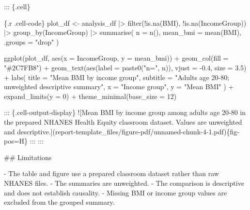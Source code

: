 \documentclass[
  letterpaper,
  DIV=11,
  numbers=noendperiod,
  oneside]{scrreprt}
\newenvironment{Shaded}{\begin{snugshade}}{\end{snugshade}}
\newcommand{\AlertTok}[1]{\textcolor[rgb]{0.68,0.00,0.00}{#1}}
\newcommand{\AttributeTok}[1]{\textcolor[rgb]{0.40,0.45,0.13}{#1}}
\newcommand{\DecValTok}[1]{\textcolor[rgb]{0.68,0.00,0.00}{#1}}
\newcommand{\FloatTok}[1]{\textcolor[rgb]{0.68,0.00,0.00}{#1}}
\newcommand{\FunctionTok}[1]{\textcolor[rgb]{0.28,0.35,0.67}{#1}}
\newcommand{\InformationTok}[1]{\textcolor[rgb]{0.37,0.37,0.37}{#1}}
\newcommand{\NormalTok}[1]{\textcolor[rgb]{0.00,0.23,0.31}{#1}}
\newcommand{\OtherTok}[1]{\textcolor[rgb]{0.00,0.23,0.31}{#1}}
\newcommand{\SpecialCharTok}[1]{\textcolor[rgb]{0.37,0.37,0.37}{#1}}
\newcommand{\SpecialStringTok}[1]{\textcolor[rgb]{0.13,0.47,0.30}{#1}}
\newcommand{\StringTok}[1]{\textcolor[rgb]{0.13,0.47,0.30}{#1}}
\begin{document}
\begin{Shaded}
\begin{Highlighting}[numbers=left,,]
\NormalTok{::: \{.cell\}}

\InformationTok{\textasciigrave{}\textasciigrave{}\textasciigrave{}\{.r .cell{-}code\}}
\NormalTok{plot\_df }\OtherTok{\textless{}{-}}\NormalTok{ analysis\_df }\SpecialCharTok{|\textgreater{}}
  \FunctionTok{filter}\NormalTok{(}\SpecialCharTok{!}\FunctionTok{is.na}\NormalTok{(BMI), }\SpecialCharTok{!}\FunctionTok{is.na}\NormalTok{(IncomeGroup)) }\SpecialCharTok{|\textgreater{}}
  \FunctionTok{group\_by}\NormalTok{(IncomeGroup) }\SpecialCharTok{|\textgreater{}}
  \FunctionTok{summarise}\NormalTok{(}
    \AttributeTok{n =} \FunctionTok{n}\NormalTok{(),}
    \AttributeTok{mean\_bmi =} \FunctionTok{mean}\NormalTok{(BMI),}
    \AttributeTok{.groups =} \StringTok{"drop"}
\NormalTok{  )}

\FunctionTok{ggplot}\NormalTok{(plot\_df, }\FunctionTok{aes}\NormalTok{(}\AttributeTok{x =}\NormalTok{ IncomeGroup, }\AttributeTok{y =}\NormalTok{ mean\_bmi)) }\SpecialCharTok{+}
  \FunctionTok{geom\_col}\NormalTok{(}\AttributeTok{fill =} \StringTok{"\#2C7FB8"}\NormalTok{) }\SpecialCharTok{+}
  \FunctionTok{geom\_text}\NormalTok{(}\FunctionTok{aes}\NormalTok{(}\AttributeTok{label =} \FunctionTok{paste0}\NormalTok{(}\StringTok{"n="}\NormalTok{, n)), }\AttributeTok{vjust =} \SpecialCharTok{{-}}\FloatTok{0.4}\NormalTok{, }\AttributeTok{size =} \FloatTok{3.5}\NormalTok{) }\SpecialCharTok{+}
  \FunctionTok{labs}\NormalTok{(}
    \AttributeTok{title =} \StringTok{"Mean BMI by income group"}\NormalTok{,}
    \AttributeTok{subtitle =} \StringTok{"Adults age 20{-}80; unweighted descriptive summary"}\NormalTok{,}
    \AttributeTok{x =} \StringTok{"Income group"}\NormalTok{,}
    \AttributeTok{y =} \StringTok{"Mean BMI"}
\NormalTok{  ) }\SpecialCharTok{+}
  \FunctionTok{expand\_limits}\NormalTok{(}\AttributeTok{y =} \DecValTok{0}\NormalTok{) }\SpecialCharTok{+}
  \FunctionTok{theme\_minimal}\NormalTok{(}\AttributeTok{base\_size =} \DecValTok{12}\NormalTok{)}
\InformationTok{\textasciigrave{}\textasciigrave{}\textasciigrave{}}

\NormalTok{::: \{.cell{-}output{-}display\}}
\AlertTok{![Mean BMI by income group among adults age 20{-}80 in the prepared NHANES Health Equity classroom dataset. Values are unweighted and descriptive.](report{-}template\_files/figure{-}pdf/unnamed{-}chunk{-}4{-}1.pdf)}\NormalTok{\{fig{-}pos=\textquotesingle{}H\textquotesingle{}\}}
\NormalTok{:::}
\NormalTok{:::}


\FunctionTok{\#\# Limitations}

\SpecialStringTok{{-} }\NormalTok{The table and figure use a prepared classroom dataset rather than raw NHANES files.}
\SpecialStringTok{{-} }\NormalTok{The summaries are unweighted.}
\SpecialStringTok{{-} }\NormalTok{The comparison is descriptive and does not establish causality.}
\SpecialStringTok{{-} }\NormalTok{Missing BMI or income group values are excluded from the grouped summary.}


\end{Highlighting}
\end{Shaded}
\end{document}
